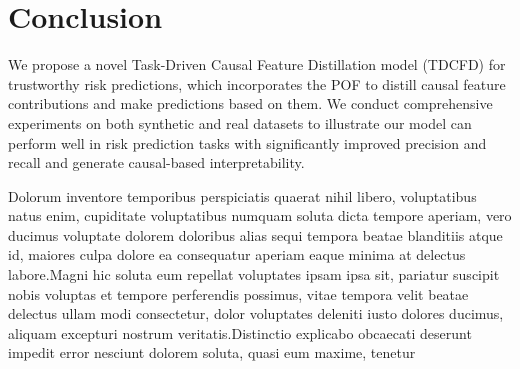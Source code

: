 \documentclass[letterpaper]{article} %
\theoremstyle{definition}
\theoremstyle{remark}
\begin{document}
\section{Conclusion}

We propose a novel Task-Driven Causal Feature Distillation model (TDCFD) for trustworthy risk predictions, which incorporates the POF to distill causal feature contributions and make predictions based on them. We conduct comprehensive experiments on both synthetic and real datasets to illustrate our model can perform well in risk prediction tasks with significantly improved precision and recall and generate causal-based interpretability.




Dolorum inventore temporibus perspiciatis quaerat nihil libero, voluptatibus natus enim, cupiditate voluptatibus numquam soluta dicta tempore aperiam, vero ducimus voluptate dolorem doloribus alias sequi tempora beatae blanditiis atque id, maiores culpa dolore ea consequatur aperiam eaque minima at delectus labore.Magni hic soluta eum repellat voluptates ipsam ipsa sit, pariatur suscipit nobis voluptas et tempore perferendis possimus, vitae tempora velit beatae delectus ullam modi consectetur, dolor voluptates deleniti iusto dolores ducimus, aliquam excepturi nostrum veritatis.Distinctio explicabo obcaecati deserunt impedit error nesciunt dolorem soluta, quasi eum maxime, tenetur

\end{document}
